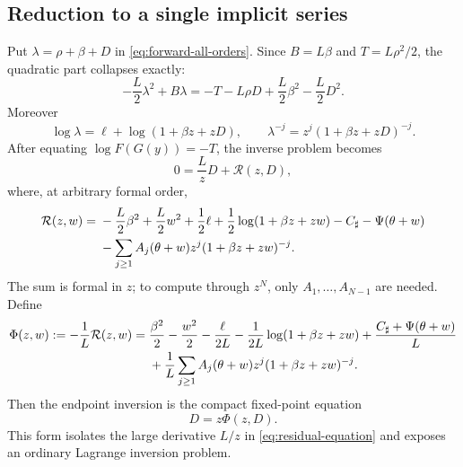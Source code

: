 \documentclass[11pt,oneside]{article}
\numberwithin{equation}{section}
\theoremstyle{definition}
\theoremstyle{remark}
\newcommand{\Csharp}{C_{\sharp}}
\begin{document}
\subsection{Reduction to a single implicit series}
Put $\lambda=\rho+\beta+D$ in \cref{eq:forward-all-orders}.  Since
$B=L\beta$ and $T=L\rho^2/2$, the quadratic part collapses exactly:
\begin{equation}
 -\frac L2\lambda^2+B\lambda
 =-T-L\rho D+\frac L2\beta^2-\frac L2D^2.
 \label{eq:quadratic-collapse}
\end{equation}
Moreover
\begin{equation}
 \log\lambda=\ell+\log(1+\beta z+zD),
 \qquad
 \lambda^{-j}=z^j(1+\beta z+zD)^{-j}.
 \label{eq:lambda-substitution}
\end{equation}
After equating $\log F(G(y))=-T$, the inverse problem becomes
\begin{equation}
 0=\frac LzD+\mathcal R(z,D),
 \label{eq:residual-equation}
\end{equation}
where, at arbitrary formal order,
\begin{align}
 \mathcal R(z,w)={}&-\frac L2\beta^2+\frac L2w^2+\frac12\ell
 +\frac12\log(1+\beta z+zw)-\Csharp-\Psi(\theta+w)
 \notag\\
 &-\sum_{j\ge1}A_j(\theta+w)z^j(1+\beta z+zw)^{-j}.
 \label{eq:R-formal}
\end{align}
The sum is formal in $z$; to compute through $z^N$, only $A_1,\ldots,A_{N-1}$ are needed.  Define
\begin{align}
 \Phi(z,w):=-\frac1L\mathcal R(z,w)
 ={}&\frac{\beta^2}{2}-\frac{w^2}{2}-\frac{\ell}{2L}
 -\frac1{2L}\log(1+\beta z+zw)
 +\frac{\Csharp+\Psi(\theta+w)}L
 \notag\\
 &+\frac1L\sum_{j\ge1}A_j(\theta+w)z^j
 (1+\beta z+zw)^{-j}.
 \label{eq:Phi-definition}
\end{align}
Then the endpoint inversion is the compact fixed-point equation
\begin{equation}
 \boxed{\quad D=z\Phi(z,D).\quad}
 \label{eq:D-fixed-point}
\end{equation}
This form isolates the large derivative $L/z$ in \cref{eq:residual-equation} and exposes an ordinary Lagrange inversion problem.
\end{document}
